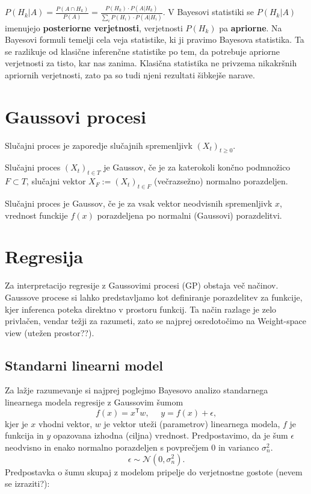 \documentclass[12pt,a4paper]{amsart}
\theoremstyle{definition} %
\theoremstyle{plain} %
\begin{document}
  $P(H_{k} | A) =\frac{ P(A \cap H_{k}) }{P(A)} =  \frac{ P(H_{k}) \cdot  P(A| H_{k})}{ \sum\limits_{i} P(H_{i}) \cdot P(A|H_{i})} $. 
\opomba V Bayesovi statistiki se $P(H_{k} | A)$ imenujejo \textbf{posteriorne verjetnosti}, verjetnosti $ P(H_{k})$ pa \textbf{apriorne}. Na Bayesovi formuli temelji cela veja statistike, ki ji pravimo Bayesova statistika. Ta se razlikuje od klasične inferenčne statistike po tem, da potrebuje apriorne verjetnosti za
tisto, kar nas zanima. Klasična statistika ne privzema nikakršnih apriornih verjetnosti, zato pa so tudi njeni rezultati šibkejše narave.

\section{Gaussovi procesi} 

Slučajni proces je zaporedje slučajnih spremenljivk $(X_t)_{t\ge0 } $.

Slučajni proces $(X_t)_{t \in T } $ je Gaussov, če je za katerokoli končno podmnožico $ F \subset T$, slučajni vektor $ X_F := (X_t)_{t \in F}$ (večrazsežno) normalno porazdeljen. 


\opomba Slučajni proces je Gaussov, če je za vsak vektor neodvisnih spremenljivk $x$, vrednost funckije $f(x)$ porazdeljena po normalni (Gaussovi) porazdelitvi.

\section{Regresija}

Za interpretacijo regresije z Gaussovimi procesi (GP) obstaja več načinov. Gaussove procese si lahko predstavljamo kot definiranje porazdelitev za funkcije, kjer inferenca poteka direktno v prostoru funkcij. Ta način razlage je zelo privlačen, vendar težji za razumeti, zato se najprej osredotočimo na Weight-space view (utežen prostor??).

\subsection{Standarni linearni model}
Za lažje razumevanje si najprej poglejmo Bayesovo analizo standarnega linearnega modela regresije z Gaussovim šumom
$$ f(x) = x^\mathsf{T} w, ~~~~~~  y= f(x) + \epsilon, $$
kjer je $x$ vhodni vektor, $w$ je vektor uteži (parametrov) linearnega modela, $f$ je funkcija in $y$ opazovana izhodna (ciljna) vrednost. Predpostavimo, da je šum $\epsilon$ neodvisno in enako normalno porazdeljen s povprečjem 0 in varianco $ \sigma_{n}^2$.
$$ \epsilon \sim \mathcal{N}(0, \sigma_{n}^2).$$
Predpostavka o šumu skupaj z modelom pripelje do verjetnostne gostote (nevem se izraziti?): 
\end{document}
